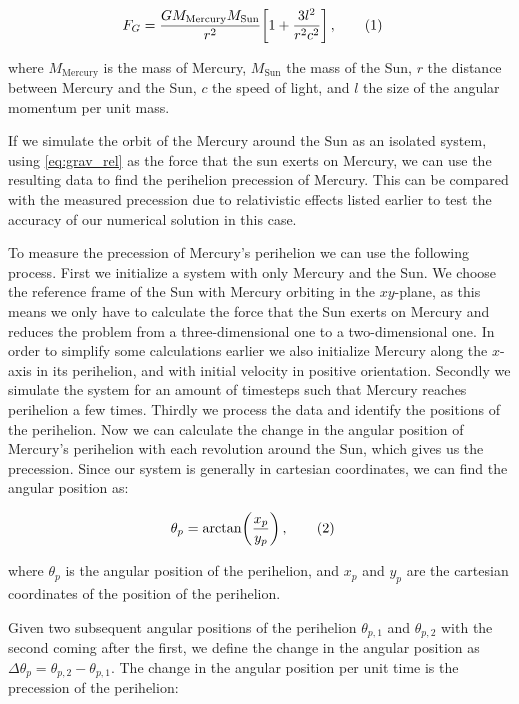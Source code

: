 \documentclass[reprint,english,notitlepage]{revtex4-1}  %
\newcommand\numberthis{\addtocounter{equation}{1}\tag{\theequation}}
\begin{document}
\begin{align*}
F_G &= \frac{GM_\text{Mercury} M_\text{Sun}}{r^2} \bigg[ 1 + \frac{3l^2}{r^2 c^2}\bigg] \, , \numberthis \label{eq:grav_rel} 
\end{align*}

where $M_\text{Mercury}$ is the mass of Mercury, $M_\text{Sun}$ the mass of the Sun, $r$ the distance between Mercury and the Sun, $c$ the speed of light, and $l$ the size of the angular momentum per unit mass. 

If we simulate the orbit of the Mercury around the Sun as an isolated system, using \eqref{eq:grav_rel} as the force that the sun exerts on Mercury, we can use the resulting data to find the perihelion precession of Mercury. This can be compared with the measured precession due to relativistic effects listed earlier to test the accuracy of our numerical solution in this case. 

To measure the precession of Mercury's perihelion we can use the following process. First we initialize a system with only Mercury and the Sun. We choose the reference frame of the Sun with Mercury orbiting in the $xy$-plane, as this means we only have to calculate the force that the Sun exerts on Mercury and reduces the problem from a three-dimensional one to a two-dimensional one. In order to simplify some calculations earlier we also initialize Mercury along the $x$-axis in its perihelion, and with initial velocity in positive orientation. Secondly we simulate the system for an amount of timesteps such that Mercury reaches perihelion a few times. Thirdly we process the data and identify the positions of the perihelion. Now we can calculate the change in the angular position of Mercury's perihelion with each revolution around the Sun, which gives us the precession. Since our system is generally in cartesian coordinates, we can find the angular position as:

\begin{align*}
\theta_p &= \arctan(\frac{x_p}{y_p}) \, ,\numberthis \label{eq:prec_ang_pos}
\end{align*}

where $\theta_p$ is the angular position of the perihelion, and $x_p$ and $y_p$ are the cartesian coordinates of the position of the perihelion.

Given two subsequent angular positions of the perihelion $\theta_{p,1}$ and $\theta_{p,2}$ with the second coming after the first, we define the change in the angular position as $\Delta \theta_p = \theta_{p,2} - \theta_{p,1}$. The change in the angular position per unit time is the precession of the perihelion:
\end{document}
